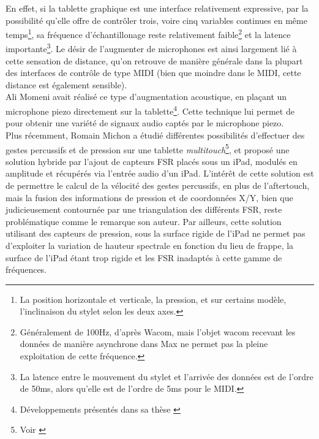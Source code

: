 \noindent En effet, si la tablette graphique est une interface relativement expressive, par la possibilité qu'elle offre de contrôler trois, voire cinq variables continues en même temps\footnote{La position horizontale et verticale, la pression, et sur certains modèle, l'inclinaison du stylet selon les deux axes.}, sa fréquence d'échantillonage reste relativement faible\footnote{Généralement de 100Hz, d'après Wacom, mais l'objet wacom recevant les données de manière asynchrone dans Max ne permet pas la pleine exploitation de cette fréquence.} et la latence importante\footnote{La latence entre le mouvement du stylet et l'arrivée des données est de l'ordre de 50ms, alors qu'elle est de l'ordre de 5ms pour le \gls{MIDI}.}. Le désir de l'augmenter de microphones est ainsi largement lié à cette sensation de distance, qu'on retrouve de manière générale dans la plupart des interfaces de contrôle de type \gls{MIDI} (bien que moindre dans le \gls{MIDI}, cette distance est également sensible).\\
\indent Ali Momeni avait réalisé ce type d'augmentation acoustique, en plaçant un microphone piezo directement sur la tablette\footnote{Développements présentés dans sa thèse \cite{momeni_composing_2005}}. Cette technique lui permet de  pour obtenir une variété de signaux audio captés par le microphone piezo.\\
\indent Plus récemment, Romain Michon a étudié différentes possibilités d'effectuer des gestes percussifs et de pression sur une tablette \textit{multitouch}\footnote{Voir \cite{michon_nuance_2016}}, et proposé une solution hybride par l'ajout de capteurs \gls{FSR} placés sous un iPad, modulés en amplitude et récupérés via l'entrée audio d'un iPad. L'intérêt de cette solution est de permettre le calcul de la vélocité des gestes percussifs, en plus de l'aftertouch, mais la fusion des informations de pression et de coordonnées X/Y, bien que judicieusement contournée par une triangulation des différents \gls{FSR}, reste problématique comme le remarque son auteur. Par ailleurs, cette solution utilisant des capteurs de pression, sous la surface rigide de l'iPad ne permet pas d'exploiter la variation de hauteur spectrale en fonction du lieu de frappe, la surface de l'iPad étant trop rigide et les \gls{FSR} inadaptés à cette gamme de fréquences.\\
